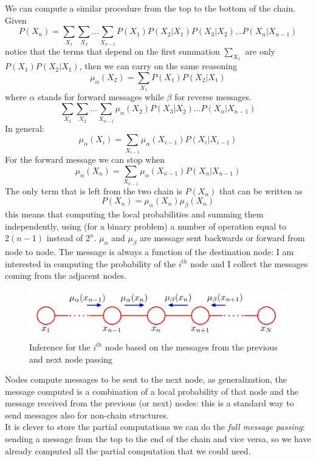         We can compute a similar procedure from the top to the bottom of the chain. Given
        $$P(X_n) = \sum_{X_1} \sum_{X_2} \dots \sum_{X_{n-1}} P(X_1)P(X_2|X_1)P(X_3|X_2)\dots P(X_n|X_{n-1})$$ 
        notice that the terms that depend on the first summation $\sum_{X_1}$ are only $P(X_1)P(X_2|X_1)$, then we can carry on the same reasoning
        $$\mu_\alpha (X_{2}) = \sum _{X_1} P(X_1)P(X_2|X_{1})$$
        where $\alpha$ stands for forward messages while $\beta$ for reverse messages.
        $$\sum_{X_2}\sum_{X_2}\dots \sum_{X_{n-1}} \mu_{\alpha}(X_2) P(X_3|X_2) \dots P(X_{n}|X_{n-1})$$
        In general: 
        $$\mu_\alpha (X_{i}) = \sum _{X_{i-1}} \mu_\alpha(X_{i-1}) P(X_i|X_{i-1})$$
        For the forward message we can stop when
        $$\mu_\alpha (X_{n}) = \sum_{X_{n-1}} \mu_\alpha (X_{n-1}) P(X_n|X_{n-1})$$
        The only term that is left from the two chain is $P(X_n)$ that can be written as
        $$P(X_n) = \mu_\alpha (X_n) \mu_\beta(X_n)$$
        this means that computing the local probabilities and summing them independently, using (for a binary problem) a number of operation equal to $2(n-1)$ instead of $2^n$. $\mu_\alpha$ and $\mu_\beta$ are message sent backwards or forward from node to node. 
        The message is always a function of the destination node: I am interested in computing the probability of the $i^{th}$ node and I collect the messages coming from the adjacent nodes.
        \begin{figure}[h]
            \centering
            \includegraphics[scale=0.3]{images/chain_inference_message_passing.png}
            \caption{Inference for the $i^{th}$ node based on the messages from the previous and next node passing}
            \label{fig:message_passing_inference_BN_chain}
        \end{figure}
        Nodes compute messages to be sent to the next node, as generalization, the message computed is a combination of a local probability of that node and the message received from the previous (or next) nodes: this is a standard way to send messages also for non-chain structures.\\
        
        It is clever to store the partial computations we can do the \textit{full message passing}: sending a message from the top to the end of the chain and vice versa, so we have already computed all the partial computation that we could need.\\
    
